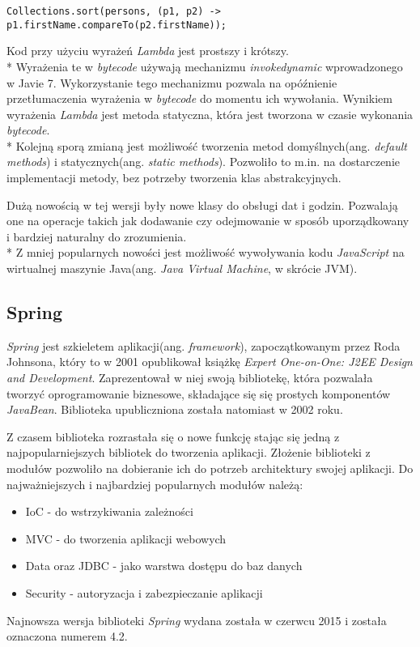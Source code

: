 \begin{lstlisting}[caption=Sortowanie kolekcji przy użyciu wyrażeń \textsl{Lambda}, label={lst:javalambda}, aboveskip=0mm]
Collections.sort(persons, (p1, p2) -> p1.firstName.compareTo(p2.firstName));
\end{lstlisting}
Kod przy użyciu wyrażeń \textsl{Lambda} jest prostszy i krótszy.\\*
Wyrażenia te w \textsl{bytecode} używają mechanizmu \textsl{invokedynamic} wprowadzonego w Javie 7. Wykorzystanie tego mechanizmu pozwala na opóźnienie przetłumaczenia wyrażenia w \textsl{bytecode} do momentu ich wywołania. Wynikiem wyrażenia \textsl{Lambda} jest metoda statyczna, która jest tworzona w czasie wykonania \textsl{bytecode}.\\*
Kolejną sporą zmianą jest możliwość tworzenia metod domyślnych(ang. \textsl{default methods}) i statycznych(ang. \textsl{static methods}). Pozwoliło to m.in. na dostarczenie implementacji metody, bez potrzeby tworzenia klas abstrakcyjnych.

Dużą nowością w tej wersji były nowe klasy do obsługi dat i godzin. Pozwalają one na operacje takich jak dodawanie czy odejmowanie w sposób uporządkowany i bardziej naturalny do zrozumienia.\\*
Z mniej popularnych nowości jest możliwość wywoływania kodu \textsl{JavaScript} na wirtualnej maszynie Java(ang. \textsl{Java Virtual Machine}, w skrócie JVM).


\subsection{Spring}
\textsl{Spring} jest szkieletem aplikacji(ang. \textsl{framework}), zapoczątkowanym przez Roda Johnsona, który to w 2001 opublikował książkę \textsl{Expert One-on-One: J2EE Design and Development}\cite{jeedesign}. Zaprezentował w niej swoją bibliotekę, która pozwalała tworzyć oprogramowanie biznesowe, składające się się prostych komponentów \textsl{JavaBean}. Biblioteka upubliczniona została natomiast w 2002 roku\cite{springinaction}.

Z czasem biblioteka rozrastała się o nowe funkcję stając się jedną z najpopularniejszych bibliotek do tworzenia aplikacji. Złożenie biblioteki z modułów pozwoliło na dobieranie ich do potrzeb architektury swojej aplikacji. Do najważniejszych i najbardziej popularnych modułów należą:
\begin{itemize}
\item IoC - do wstrzykiwania zależności
\item MVC - do tworzenia aplikacji webowych
\item Data oraz JDBC - jako warstwa dostępu do baz danych
\item Security - autoryzacja i zabezpieczanie aplikacji
\end{itemize}
Najnowsza wersja biblioteki \textsl{Spring} wydana została w czerwcu 2015 i została oznaczona numerem 4.2.

